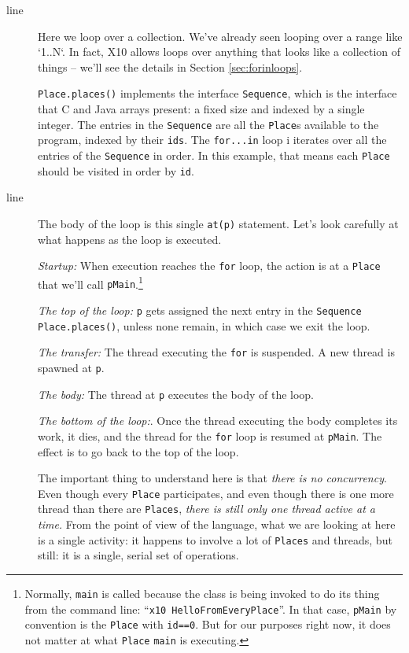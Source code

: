 \begin{description}
\item[line ] 
Here we loop over a collection.
We've already seen looping over a range like \xcd`1..N`.   
In fact, X10 allows loops over anything that looks like a
collection of things -- we'll see the details in Section \ref{sec:forinloops}.

{\tt Place.places()} implements the
interface {\tt Sequence}, which is the interface that C and Java arrays
present: a fixed size and indexed by a single integer.  The entries in the
{\tt Sequence} are all the {\tt Place}s available to the program, indexed
by their {\tt ids}. 
The {\tt for...in} loop i iterates over all the entries of the {\tt Sequence}
in order.  In this example, that means each {\tt Place} should be visited in order
by {\tt id}.  

\item[line ]
The body of the loop is this single {\tt at(p)} statement.  Let's look carefully
at what happens as the loop is executed.

    {\em Startup:}  When
    execution reaches the {\tt for} loop, the action is at a
    {\tt Place} that we'll call {\tt pMain}.\footnote{
    Normally, {\tt main} is called because the class is being invoked to do its thing
    from the command line: ``{\tt x10 HelloFromEveryPlace}''.  In that case,
    {\tt pMain} by convention is the {\tt Place} with {\tt id==0}.  But for our
    purposes right now, it does not matter at what {\tt Place} {\tt main} is executing.
    }
    
     {\em The top of the loop:}  {\tt p} gets assigned the next entry in the
     {\tt Sequence} {\tt Place.places()}, unless none
     remain, in which case we exit the loop.  
     
     {\em The transfer:} The thread executing the {\tt for} is suspended.
     A new thread is spawned at {\tt p}.
     
     {\em The body:} The thread at {\tt p} executes the body of the loop.
     
     {\em The bottom of the loop:}. Once the thread executing the body
     completes its work, it dies, and  the thread for the
     {\tt for} loop is resumed at {\tt pMain}.
     The effect is to go back to the top of the loop.

 The important thing to understand here is that {\em there is no concurrency}.
 Even though every {\tt Place} participates, and even though
 there is one more thread than
 there are {\tt Places}, {\em there is still only one thread active at a time.}
 From the point of view of the \Xten{} language, what we are looking at here
 is a single activity: it happens to involve a lot of {\tt Places} and threads,
 but still: it is a single, serial set of operations.  
 

\end{description}
